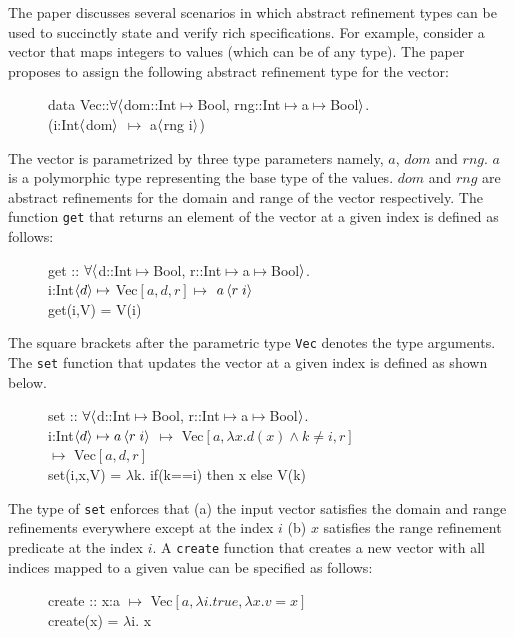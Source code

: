 The paper discusses several scenarios in which abstract refinement types can be used to succinctly state and verify rich specifications. For example, consider a vector that maps integers to values (which can be of any type).
The paper proposes to assign the following abstract refinement type for the vector:
%
\begin{figure}[h]
\begin{myprogram}
data Vec::$\forall \langle$dom::Int$\mapsto$Bool, rng::Int$\mapsto$a$\mapsto$Bool$\rangle$. \\
\> (i:Int$\langle$dom$\rangle$ $\mapsto$ a$\langle$rng i$\rangle$)
\end{myprogram} 
\end{figure}
%
The vector is parametrized by three type parameters namely, $a$, $dom$ and $rng$.
$a$ is a polymorphic type representing the base type of the values.
$dom$ and $rng$ are abstract refinements for the domain and range of the vector respectively.
The function \texttt{get} that returns an element of the vector at a given index is defined as follows:
%
\begin{figure}[h]
\begin{myprogram}
get :: $\forall \langle$d::Int$\mapsto$Bool, r::Int$\mapsto$a$\mapsto$Bool$\rangle$. \\
\> \> i:Int$\left< d \right> \mapsto$ Vec$[a,d,r] \mapsto$ $a\left< r \; i \right>$ \\
\> get(i,V) = V(i)
\end{myprogram}
\end{figure}
%
The square brackets after the parametric type \texttt{Vec} denotes the type arguments.
The \texttt{set} function that updates the vector at a given index is defined as shown below.
%
\begin{figure}[h]
\begin{myprogram}
set :: $\forall \langle$d::Int$\mapsto$Bool, r::Int$\mapsto$a$\mapsto$Bool$\rangle$. \\
\> \> i:Int$\left< d \right> \mapsto a\left< r \; i \right>$ $\mapsto$ 
Vec$[a,\lambda x. d(x) \wedge k \ne i,r]$ \\
\> \> $\mapsto$ Vec$[a,d,r]$ \\
\> set(i,x,V) = $\lambda$k. if(k==i)  then x else V(k)
\end{myprogram}
\end{figure}
%
The type of \texttt{set} enforces that (a) the input vector satisfies the
domain and range refinements everywhere except at the index $i$ 
(b) $x$ satisfies the range refinement predicate at the index $i$.
A \texttt{create} function that creates a new vector with all indices mapped 
to a given value can be specified as follows:
%
\begin{figure}[h]
\begin{myprogram}
create :: x:a $\mapsto$ Vec$[a,\lambda i.true,\lambda x. v = x]$  \\
\> create(x) = $\lambda$i. x
\end{myprogram}
\end{figure}

